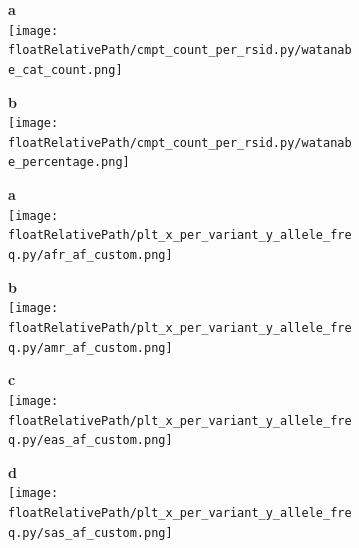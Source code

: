\begin{figure}[!ht]
    \centering
    \begin{subfigure}[]{.49\textwidth}
        \textbf{a}
        \\
        \texttt{[image: \\floatRelativePath/cmpt\_count\_per\_rsid.py/watanabe\_cat\_count.png]}
    \end{subfigure}
    \begin{subfigure}[]{.49\textwidth}
        \textbf{b}
        \\
        \texttt{[image: \\floatRelativePath/cmpt\_count\_per\_rsid.py/watanabe\_percentage.png]}
    \end{subfigure}

    \caption{}

\end{figure}

%
%

\begin{figure}[!tbp]

    \begin{subfigure}[]{.49\textwidth}
        \textbf{a}
        \\
        \texttt{[image: \\floatRelativePath/plt\_x\_per\_variant\_y\_allele\_freq.py/afr\_af\_custom.png]}
    \end{subfigure}
%
    \begin{subfigure}[]{.49\textwidth}
        \textbf{b}
        \\
        \texttt{[image: \\floatRelativePath/plt\_x\_per\_variant\_y\_allele\_freq.py/amr\_af\_custom.png]}
    \end{subfigure}

    \begin{subfigure}[]{.49\textwidth}
        \textbf{c}
        \\
        \texttt{[image: \\floatRelativePath/plt\_x\_per\_variant\_y\_allele\_freq.py/eas\_af\_custom.png]}
    \end{subfigure}
%
    \centering
    \begin{subfigure}[]{.49\textwidth}
        \textbf{d}
        \\
        \texttt{[image: \\floatRelativePath/plt\_x\_per\_variant\_y\_allele\_freq.py/sas\_af\_custom.png]}
    \end{subfigure}

    \caption{}

\end{figure}


